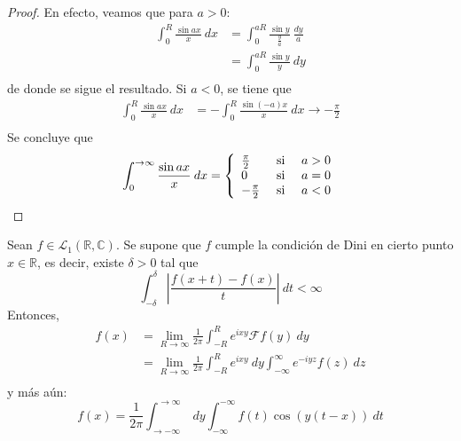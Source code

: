 \documentclass[12pt]{report}
\newcounter{it}
\theoremstyle{largebreak}
\newcommand\abs[1]{\ensuremath{\left|#1\right|}}
\newcommand{\fou}[1]{\ensuremath{\mathcal{F}#1}}
\begin{document}
    \begin{proof}
        En efecto, veamos que para $a>0$:
        \begin{equation*}
            \begin{split}
                \int_0^R\frac{\sin ax}{x}\:dx&=\int_0^{aR}\frac{\sin y}{\frac{y}{a}}\:\frac{dy}{a}\\
                &=\int_0^{aR} \frac{\sin y}{y}\:dy\\
            \end{split}
        \end{equation*}
        de donde se sigue el resultado. Si $a<0$, se tiene que
        \begin{equation*}
            \begin{split}
                \int_0^R\frac{\sin ax}{x}\:dx&=-\int_0^R\frac{\sin (-a)x}{x}\:dx\longrightarrow -\frac{\pi}{2}\\
            \end{split}
        \end{equation*}
        Se concluye que
        \begin{equation*}
            \int_0^{ \rightarrow\infty}\frac{\sin ax}{x}\:dx=\left\{
                \begin{array}{lcr}
                    \frac{\pi}{2} & \textup{ si } & a>0\\
                    0 & \textup{ si } & a=0\\
                    -\frac{\pi}{2} & \textup{ si } & a<0\\
                \end{array}
            \right.
        \end{equation*}
    \end{proof}

    \begin{theor}
        Sean $f\in\mathcal{L}_1(\mathbb{R},\mathbb{C})$. Se supone que $f$ cumple la condición de Dini en cierto punto $x\in\mathbb{R}$, es decir, existe $\delta>0$ tal que
        \begin{equation*}
            \int_{-\delta}^\delta\abs{\frac{f(x+t)-f(x)}{t}}\:dt<\infty
        \end{equation*}
        Entonces,
        \begin{equation*}
            \begin{split}
                f(x)&=\lim_{ R\rightarrow\infty}\frac{1}{2\pi}\int_{ -R}^{ R}e^{ixy}\fou{f}(y)\:dy\\
                &=\lim_{ R\rightarrow\infty}\frac{1}{2\pi}\int_{ -R}^{ R}e^{ixy}\:dy\int_{-\infty}^\infty e^{ -iyz}f(z)\:dz \\
            \end{split}
        \end{equation*}
        y más aún:
        \begin{equation*}
            f(x)=\frac{1}{2\pi}\int_{ \rightarrow-\infty}^{\rightarrow\infty}\:dy\int_{ -\infty}^{ -\infty}f(t)\cos(y(t-x))\:dt
        \end{equation*}
    \end{theor}
    
\end{document}
